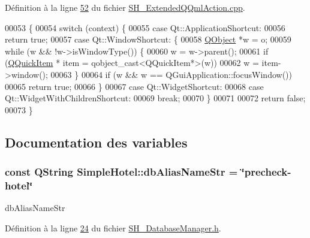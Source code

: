 Définition à la ligne \hyperlink{SH__ExtendedQQmlAction_8cpp_source_l00052}{52} du fichier \hyperlink{SH__ExtendedQQmlAction_8cpp_source}{S\-H\-\_\-\-Extended\-Q\-Qml\-Action.\-cpp}.


\begin{DoxyCode}
00053 \{
00054     \textcolor{keywordflow}{switch} (context) \{
00055     \textcolor{keywordflow}{case} Qt::ApplicationShortcut:
00056         \textcolor{keywordflow}{return} \textcolor{keyword}{true};
00057     \textcolor{keywordflow}{case} Qt::WindowShortcut: \{
00058         \hyperlink{classQObject}{QObject} *w = o;
00059         \textcolor{keywordflow}{while} (w && !w->isWindowType()) \{
00060             w = w->parent();
00061             \textcolor{keywordflow}{if} (\hyperlink{classQQuickItem}{QQuickItem} * item = qobject\_cast<QQuickItem*>(w))
00062                 w = item->window();
00063         \}
00064         \textcolor{keywordflow}{if} (w && w == QGuiApplication::focusWindow())
00065             \textcolor{keywordflow}{return} \textcolor{keyword}{true};
00066     \}
00067     \textcolor{keywordflow}{case} Qt::WidgetShortcut:
00068     \textcolor{keywordflow}{case} Qt::WidgetWithChildrenShortcut:
00069         \textcolor{keywordflow}{break};
00070     \}
00071 
00072     \textcolor{keywordflow}{return} \textcolor{keyword}{false};
00073 \}
\end{DoxyCode}


\subsection{Documentation des variables}
\hypertarget{namespaceSimpleHotel_a3efec1eebc1e42b57c0a7f64176bb25d}{
\subsubsection[{db\-Alias\-Name\-Str}]{\setlength{\rightskip}{0pt plus 5cm}const Q\-String Simple\-Hotel\-::db\-Alias\-Name\-Str = \char`\"{}precheck-\/hotel\char`\"{}\hspace{0.3cm}{\ttfamily [static]}}}\label{namespaceSimpleHotel_a3efec1eebc1e42b57c0a7f64176bb25d}


db\-Alias\-Name\-Str 



Définition à la ligne \hyperlink{SH__DatabaseManager_8h_source_l00024}{24} du fichier \hyperlink{SH__DatabaseManager_8h_source}{S\-H\-\_\-\-Database\-Manager.\-h}.

